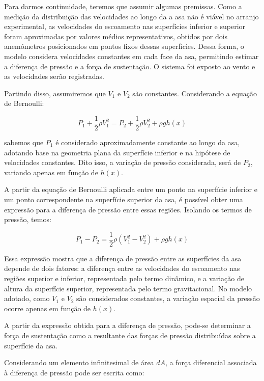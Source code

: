 \documentclass[12pt]{article}
\begin{document}
Para darmos continuidade, teremos que assumir algumas premissas. Como a medição da distribuição das velocidades ao longo da a asa não é viável no arranjo experimental, as velocidades do escoamento nas superfícies inferior e superior foram aproximadas por valores médios representativos, obtidos por dois anemômetros posicionados em pontos fixos dessas superfícies. Dessa forma, o modelo considera velocidades constantes em cada face da asa, permitindo estimar a diferença de pressão e a força de sustentação.
O sistema foi exposto ao vento e as velocidades serão registradas.

Partindo disso, assumiremos que $V_1$ e $ V_2$ são constantes. Considerando a equação de Bernoulli:

\begin{equation}
\textbf{$P_1 + \frac{1}{2}\rho V_{1}^{2} = P_2 + \frac{1}{2}\rho V_2^{2} + \rho g h(x)$} 
\end{equation}

sabemos que $P_1$ é considerado aproximadamente constante ao longo da asa, adotando base na geometria plana da superfície inferior e na hipótese de velocidades constantes. Dito isso, a variação de pressão considerada, será de $P_2$, variando apenas em função de $h(x)$.

A partir da equação de Bernoulli aplicada entre um ponto na superfície inferior e um ponto correspondente na superfície superior da asa, é possível obter uma expressão para a diferença de pressão entre essas regiões. Isolando os termos de pressão, temos:

\begin{equation}
\textbf{$P_1 - P_2 =  \frac{1}{2}\rho (V_{1}^{2} - V_2^{2}) + \rho g h(x)$} 
\end{equation}

Essa expressão mostra que a diferença de pressão entre as superfícies da asa depende de dois fatores: a diferença entre as velocidades do escoamento nas regiões superior e inferior, representada pelo termo dinâmico, e a variação de altura da superfície superior, representada pelo termo gravitacional. No modelo adotado, como $V_1$ e $V_2$ são considerados constantes, a variação espacial da pressão ocorre apenas em função de $h(x)$.

A partir da expressão obtida para a diferença de pressão, pode-se determinar a força de sustentação como a resultante das forças de pressão distribuídas sobre a superfície da asa.

Considerando um elemento infinitesimal de área $dA$, a força diferencial associada à diferença de pressão pode ser escrita como:
\end{document}
